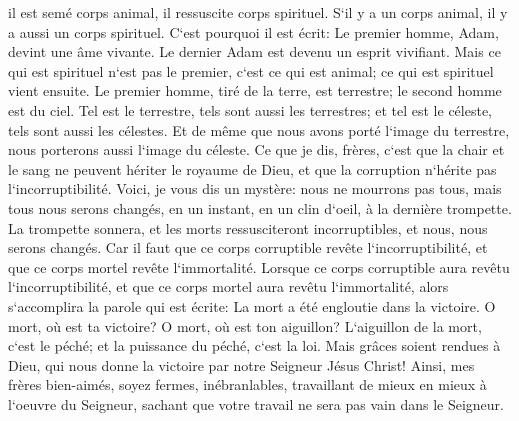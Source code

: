 \verse il est semé corps animal, il ressuscite corps spirituel. S`il y a un corps animal, il y a aussi un corps spirituel. 
\verse C`est pourquoi il est écrit: Le premier homme, Adam, devint une âme vivante. Le dernier Adam est devenu un esprit vivifiant. 
\verse Mais ce qui est spirituel n`est pas le premier, c`est ce qui est animal; ce qui est spirituel vient ensuite. 
\verse Le premier homme, tiré de la terre, est terrestre; le second homme est du ciel. 
\verse Tel est le terrestre, tels sont aussi les terrestres; et tel est le céleste, tels sont aussi les célestes. 
\verse Et de même que nous avons porté l`image du terrestre, nous porterons aussi l`image du céleste. 
\verse Ce que je dis, frères, c`est que la chair et le sang ne peuvent hériter le royaume de Dieu, et que la corruption n`hérite pas l`incorruptibilité. 
\verse Voici, je vous dis un mystère: nous ne mourrons pas tous, mais tous nous serons changés, 
\verse en un instant, en un clin d`oeil, à la dernière trompette. La trompette sonnera, et les morts ressusciteront incorruptibles, et nous, nous serons changés. 
\verse Car il faut que ce corps corruptible revête l`incorruptibilité, et que ce corps mortel revête l`immortalité. 
\verse Lorsque ce corps corruptible aura revêtu l`incorruptibilité, et que ce corps mortel aura revêtu l`immortalité, alors s`accomplira la parole qui est écrite: La mort a été engloutie dans la victoire. 
\verse O mort, où est ta victoire? O mort, où est ton aiguillon? 
\verse L`aiguillon de la mort, c`est le péché; et la puissance du péché, c`est la loi. 
\verse Mais grâces soient rendues à Dieu, qui nous donne la victoire par notre Seigneur Jésus Christ! 
\verse Ainsi, mes frères bien-aimés, soyez fermes, inébranlables, travaillant de mieux en mieux à l`oeuvre du Seigneur, sachant que votre travail ne sera pas vain dans le Seigneur. 

